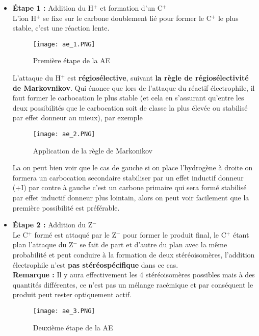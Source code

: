 \documentclass[a4paper, oneside]{book}
\begin{document}
\begin{itemize}
    \item \textbf{\'Etape 1 :} Addition du H$^+$ et formation d'un C$^+$\\
    L'ion H$^+$ se fixe sur le carbone doublement lié pour former le C$^+$ le plus stable, c'est une réaction lente.
    \begin{figure}[!h]
        \centering
        \texttt{[image: ae\_1.PNG]}
        \caption{Première étape de la AE}
        \label{fig:my_label}
    \end{figure}

    L'attaque du H$^+$ est \textbf{régiosélective}, suivant \textbf{la règle de régiosélectivité de Markovnikov}. Qui énonce que lors de l'attaque du réactif électrophile, il faut former le carbocation le plus stable (et cela en s'assurant qu'entre les deux possibilités que le carbocation soit de classe la plus élevée ou stabilisé par effet donneur au mieux), par exemple
    \begin{figure}[!h]
        \centering
        \texttt{[image: ae\_2.PNG]}
        \caption{Application de la règle de Markonikov}
        \label{fig:my_label}
    \end{figure}

    La on peut bien voir que le cas de gauche si on place l'hydrogène à droite on formera un carbocation secondaire stabiliser par un effet inductif donneur (+I) par contre à gauche c'est un carbone primaire qui sera formé stabilisé par effet inductif donneur plus lointain, alors on peut voir facilement que la première possibilité est préférable.
    \item \textbf{\'Etape 2 :} Addition du Z$^-$\\
    Le C$^+$ formé est attaqué par le Z$^-$ pour former le produit final, le C$^+$ étant plan l'attaque du Z$^-$ se fait de part et d'autre du plan avec la même probabilité et peut conduire à la formation de deux stéréoisomères, l'addition électrophile n'est \textbf{pas stéréospécifique} dans ce cas.\\
    \textbf{Remarque :} Il y aura effectivement les 4 stéréoisomères possibles mais à des quantités différentes, ce n'est pas un mélange racémique et par conséquent le produit peut rester optiquement actif.
    \begin{figure}[!h]
        \centering
        \texttt{[image: ae\_3.PNG]}
        \caption{Deuxième étape de la AE}
        \label{fig:my_label}
    \end{figure}
\end{itemize}
\end{document}
